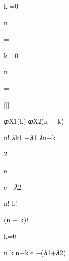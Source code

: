 \documentclass[a4paper,portrait,12pt]{article}
\begin{document}
\begin{flushleft}
k =0
\end{flushleft}


\begin{flushleft}
n
\end{flushleft}





=


\begin{flushleft}
k =0
\end{flushleft}


\begin{flushleft}
n
\end{flushleft}





=





[[[





\begin{flushleft}
𝜑X1(k) 𝜑X2(n $-$ k)
\end{flushleft}


\begin{flushleft}
n! 𝜆k1 $-$𝜆1 𝜆n$-$k
\end{flushleft}


2


\begin{flushleft}
e
\end{flushleft}


\begin{flushleft}
e $-$𝜆2
\end{flushleft}


\begin{flushleft}
n! k!
\end{flushleft}


\begin{flushleft}
(n $-$ k)!
\end{flushleft}





\begin{flushleft}
k=0
\end{flushleft}





\begin{flushleft}
n k n$-$k e $-$(𝜆1+𝜆2)
\end{flushleft}
\end{document}
